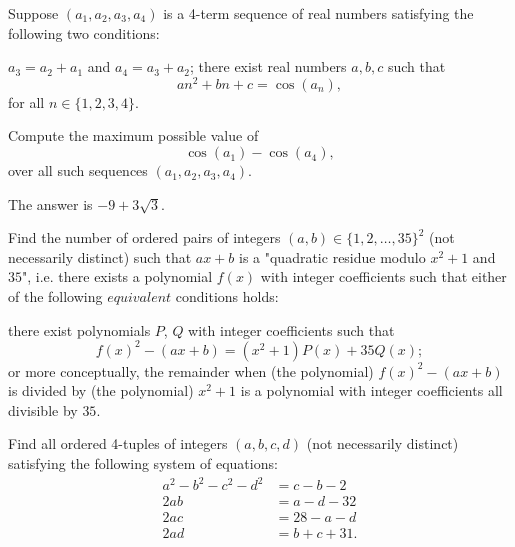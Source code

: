 \begin{question}[name={2015 HMMT, Algebra, \href{https://artofproblemsolving.com/community/c129h1071075p4658510}{Problem 7}}]
	Suppose $(a_1,a_2,a_3,a_4)$ is a 4-term sequence of real numbers satisfying the following two conditions:
	\begin{tasks}
		\task $a_3=a_2+a_1$ and $a_4=a_3+a_2$;
		\task there exist real numbers $a,b,c$ such that\[an^2+bn+c=\cos(a_n),\]for all $n\in\{1,2,3,4\}$.
	\end{tasks}
	Compute the maximum possible value of\[\cos(a_1)-\cos(a_4),\]over all such sequences $(a_1,a_2,a_3,a_4)$.
\end{question}




\begin{solution}
	The answer is $-9+3\sqrt 3$.
\end{solution}


\begin{question}[name={2015 HMMT, Algebra, \href{https://artofproblemsolving.com/community/c129h1071077p4658524}{Problem 8}}]
	Find the number of ordered pairs of integers $(a,b)\in\{1,2,\ldots,35\}^2$ (not necessarily distinct) such that $ax+b$ is a "quadratic residue modulo $x^2+1$ and $35$", i.e. there exists a polynomial $f(x)$ with integer coefficients such that either of the following $\textit{equivalent}$ conditions holds:
	\begin{tasks}
		\task there exist polynomials $P$, $Q$ with integer coefficients such that $$f(x)^2-(ax+b)=(x^2+1)P(x)+35Q(x);$$
		\task or more conceptually, the remainder when (the polynomial) $f(x)^2-(ax+b)$ is divided by (the polynomial) $x^2+1$ is a polynomial with integer coefficients all divisible by $35$.
	\end{tasks}
\end{question}




%	




\begin{question}[name={2015 HMMT, Algebra, \href{https://artofproblemsolving.com/community/c129h1071080p4658534}{Problem 10}}]
	Find all ordered 4-tuples of integers $(a,b,c,d)$ (not necessarily distinct) satisfying the following system of equations:\begin{align*}a^2-b^2-c^2-d^2&=c-b-2\\2ab&=a-d-32\\2ac&=28-a-d\\2ad&=b+c+31.\end{align*}
\end{question}




